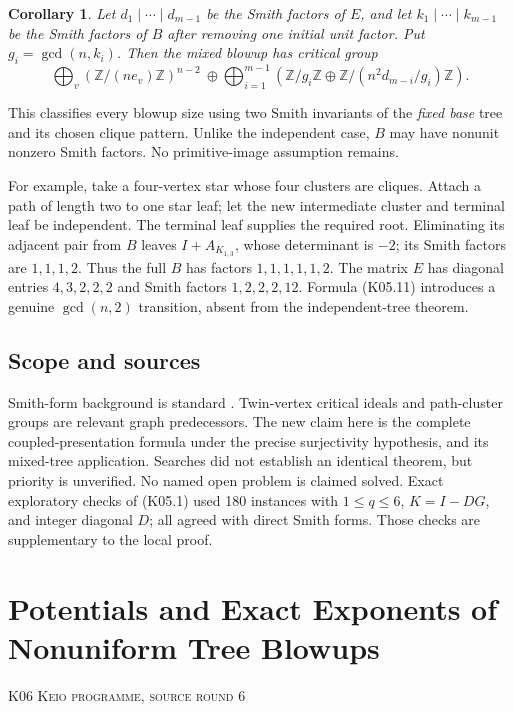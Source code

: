 \documentclass[11pt,a4paper]{article}
\newtheorem{corollary}[theorem]{Corollary}
\theoremstyle{definition}\newtheorem{definition}[theorem]{Definition}
\theoremstyle{remark}\newtheorem{remark}[theorem]{Remark}
\newcommand{\Z}{\mathbb Z}\newcommand{\Q}{\mathbb Q}\newcommand{\F}{\mathbb F}
\numberwithin{equation}{section}
\begin{document}
\begin{corollary}\label{K05-mixed}
Let $d_1\mid\cdots\mid d_{m-1}$ be the Smith factors of $E$, and let $k_1\mid\cdots\mid k_{m-1}$ be the Smith factors of $B$ after removing one initial unit factor. Put $g_i=\gcd(n,k_i)$. Then the mixed blowup has critical group
\[
 \bigoplus_v(\Z/(ne_v)\Z)^{n-2}\ \oplus
 \bigoplus_{i=1}^{m-1}\left(\Z/g_i\Z\oplus
       \Z/(n^2d_{m-i}/g_i)\Z\right).                         \tag{K05.11}
\]
\end{corollary}
This classifies every blowup size using two Smith invariants of the \emph{fixed base} tree and its chosen clique pattern. Unlike the independent case, $B$ may have nonunit nonzero Smith factors. No primitive-image assumption remains.

For example, take a four-vertex star whose four clusters are cliques. Attach a path of length two to one star leaf; let the new intermediate cluster and terminal leaf be independent. The terminal leaf supplies the required root. Eliminating its adjacent pair from $B$ leaves $I+A_{K_{1,3}}$, whose determinant is $-2$; its Smith factors are $1,1,1,2$. Thus the full $B$ has factors $1,1,1,1,1,2$. The matrix $E$ has diagonal entries $4,3,2,2,2$ and Smith factors $1,2,2,2,12$. Formula (K05.11) introduces a genuine $\gcd(n,2)$ transition, absent from the independent-tree theorem.

\subsection{Scope and sources}\label{K05-sec-5}
Smith-form background is standard \cite{ref030}. Twin-vertex critical ideals \cite{ref029} and path-cluster groups \cite{ref028} are relevant graph predecessors. The new claim here is the complete coupled-presentation formula under the precise surjectivity hypothesis, and its mixed-tree application. Searches did not establish an identical theorem, but priority is unverified. No named open problem is claimed solved. Exact exploratory checks of (K05.1) used 180 instances with $1\leq q\leq6$, $K=I-DG$, and integer diagonal $D$; all agreed with direct Smith forms. Those checks are supplementary to the local proof.




\clearpage
\section[K06 --- Potentials and Exact Exponents of Nonuniform Tree Blowups]{Potentials and Exact Exponents of Nonuniform Tree Blowups}\label{contrib-K06}
\noindent\textsc{K06 \quad Keio programme, source round 6}\par\medskip
\end{document}
